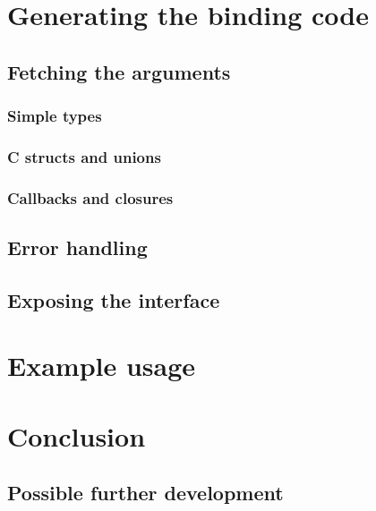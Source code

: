 \documentclass[polish, english]{iithesis}
\begin{document}
\chapter{Generating the binding code}
  \section{Fetching the arguments}
    \subsection{Simple types}
    \subsection{C structs and unions}
    \subsection{Callbacks and closures}
  \section{Error handling}
  \section{Exposing the interface}
\chapter{Example usage}
\chapter{Conclusion}
  \section{Possible further development}
\end{document}

